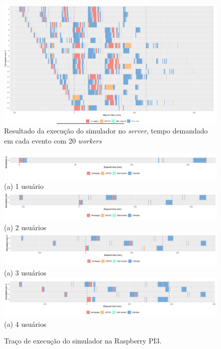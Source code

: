 \documentclass[12pt,english,brazil]{article}
\begin{document}
\begin{figure}[htbp]
  \centering 
  \includegraphics[scale=.4]{paperWSCAD2021/figures/user_x64_20_worker.png}
  \caption{Resultado da execução do simulador no \emph{server}, tempo demandado em cada evento com 20 \emph{workers}}
  \label{x64_20wroker}
\end{figure}

\begin{figure}[htbp]
  \centering 
  \includegraphics[scale=.4]{paperWSCAD2021/figures/user_PI3_1_worker.png}\\(a) 1 usuário
 \includegraphics[scale=.4]{paperWSCAD2021/figures/user_PI3_2_worker.png}\\(a) 2 usuários
 \includegraphics[scale=.4]{paperWSCAD2021/figures/user_PI3_3_worker.png}\\(a) 3 usuários
 \includegraphics[scale=.4]{paperWSCAD2021/figures/user_PI3_4_worker.png}\\(a) 4 usuários
\caption{Traço de execução do simulador na Raspberry PI3.}
  \label{PI3_1wroker}
\end{figure}
\end{document}
